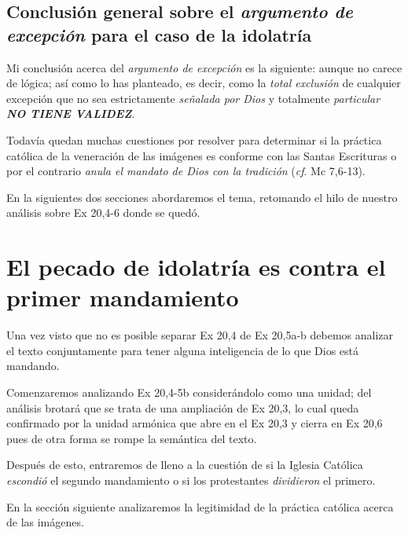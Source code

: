 \documentclass{article}
\begin{document}
\subsection{Conclusi\'on general sobre el \emph{argumento de excepci\'on} para el caso de la idolatr\'{i}a}

Mi conclusi\'on acerca del \emph{argumento de excepci\'on} es la siguiente: aunque no carece de l\'ogica; as\'{i} como lo has planteado, es decir, como la \emph{total exclusi\'on} de cualquier excepci\'on que no sea estrictamente \emph{se\~nalada por Dios} y totalmente \emph{particular} \textbf{\emph{NO TIENE VALIDEZ}}.



\noindent
Todav\'{i}a quedan muchas cuestiones por resolver para determinar si la pr\'actica cat\'olica de la veneraci\'on de las im\'agenes es conforme con las Santas Escrituras o por el contrario \emph{anula el mandato de Dios con la tradici\'on} (\emph{cf}. Mc 7,6-13).

En la siguientes dos secciones abordaremos el tema, retomando el hilo de nuestro an\'alisis sobre Ex 20,4-6 donde se qued\'o.

\section{El pecado de idolatr\'{i}a es contra el primer mandamiento}

Una vez visto que no es posible separar Ex 20,4 de Ex 20,5a-b debemos analizar el texto conjuntamente para tener alguna inteligencia de lo que Dios est\'a mandando.

Comenzaremos analizando Ex 20,4-5b consider\'andolo como una unidad; del an\'alisis brotar\'a que se trata de una ampliaci\'on de Ex 20,3, lo cual queda confirmado por la unidad arm\'onica que abre en el Ex 20,3 y cierra en Ex 20,6 pues de otra forma se rompe la sem\'antica del texto.

Despu\'es de esto, entraremos de lleno a la cuesti\'on de si la Iglesia Cat\'olica \emph{escondi\'o} el segundo mandamiento o si los protestantes \emph{dividieron} el primero.

En la secci\'on siguiente analizaremos la legitimidad de la pr\'actica cat\'olica acerca de las im\'agenes.
\end{document}
